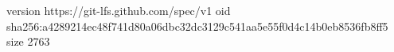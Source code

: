 version https://git-lfs.github.com/spec/v1
oid sha256:a4289214ec48f741d80a06dbc32dc3129c541aa5e55f0d4c14b0eb8536fb8ff5
size 2763
